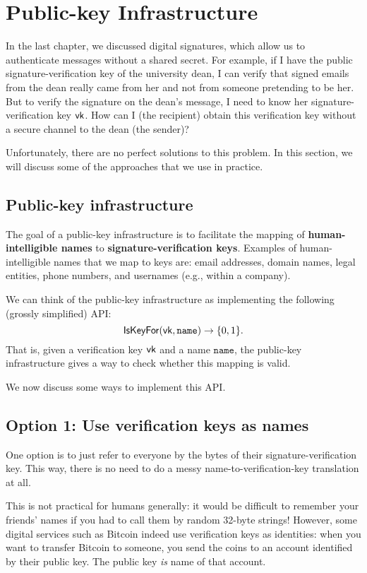 \chapter{Public-key Infrastructure}

In the last chapter, we discussed digital
signatures, which allow us to authenticate messages
without a shared secret.
For example, if I have the public signature-verification key 
of the university dean, I can verify that signed emails from 
the dean really came from her and not from someone pretending to be her.
But to verify the signature on the dean's message, I need to know her
signature-verification key $\mathsf{vk}$.
How can I (the recipient) obtain this verification key without
a secure channel to the dean (the sender)?

Unfortunately, there are no perfect solutions to this problem.
In this section, we will discuss some of the approaches that
we use in practice.

\section{Public-key infrastructure}

The goal of a public-key infrastructure is to facilitate
the mapping of \textbf{human-intelligible names} to
\textbf{signature-verification keys}.
Examples of human-intelligible names that we map to keys
are: email addresses, domain names, legal entities, phone numbers, and
usernames (e.g., within a company).

We can think of the public-key infrastructure as implementing
the following (grossly simplified) API:
\[ \mathsf{IsKeyFor}(\mathsf{vk}, \texttt{name}) \to \{0,1\}.\]
That is, given a verification key $\mathsf{vk}$ and a name $\texttt{name}$, 
the public-key infrastructure gives a way to check whether this mapping
is valid.


We now discuss some ways to implement this API.

\section{Option 1: Use verification keys as names}
One option is to just refer to everyone by the bytes of
their signature-verification key.
This way, there is no need to do a messy name-to-verification-key 
translation at all.

This is not practical for humans generally: it would be difficult
to remember your friends' names if you had to call them by 
random 32-byte strings!
However, some digital services such as Bitcoin indeed use verification
keys as identities: when you want to transfer Bitcoin to someone,
you send the coins to an account identified by their public key.
The public key \emph{is} name of that account.

